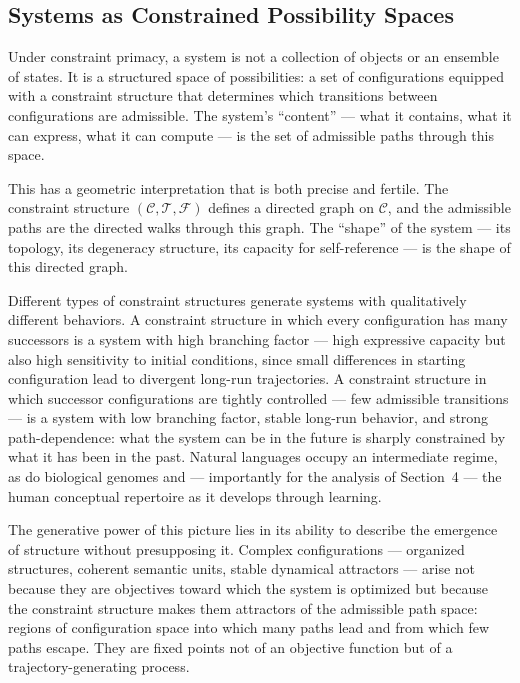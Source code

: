 \documentclass[12pt, twoside]{article}
\theoremstyle{plain}
\theoremstyle{definition}
\theoremstyle{remark}
\newcommand{\Cfg}{\mathcal{C}}
\newcommand{\Trans}{\mathcal{T}}
\begin{document}
\subsection{Systems as Constrained Possibility Spaces}

Under constraint primacy, a system is not a collection of objects or
an ensemble of states.
It is a structured space of possibilities: a set of configurations
equipped with a constraint structure that determines which transitions
between configurations are admissible.
The system's ``content'' — what it contains, what it can express,
what it can compute — is the set of admissible paths through this space.

This has a geometric interpretation that is both precise and fertile.
The constraint structure $(\Cfg, \Trans, \mathcal{F})$ defines a
directed graph on $\Cfg$, and the admissible paths are the directed
walks through this graph.
The ``shape'' of the system — its topology, its degeneracy structure,
its capacity for self-reference — is the shape of this directed graph.

Different types of constraint structures generate systems with
qualitatively different behaviors.
A constraint structure in which every configuration has many successors
is a system with high branching factor — high expressive capacity but
also high sensitivity to initial conditions, since small differences
in starting configuration lead to divergent long-run trajectories.
A constraint structure in which successor configurations are tightly
controlled — few admissible transitions — is a system with low
branching factor, stable long-run behavior, and strong path-dependence:
what the system can be in the future is sharply constrained
by what it has been in the past.
Natural languages occupy an intermediate regime, as do biological genomes
and — importantly for the analysis of Section~4 — the human conceptual
repertoire as it develops through learning.

The generative power of this picture lies in its ability to describe
the emergence of structure without presupposing it.
Complex configurations — organized structures, coherent semantic units,
stable dynamical attractors — arise not because they are objectives
toward which the system is optimized but because the constraint structure
makes them attractors of the admissible path space:
regions of configuration space into which many paths lead and from which
few paths escape.
They are fixed points not of an objective function but of a
trajectory-generating process.
\end{document}
